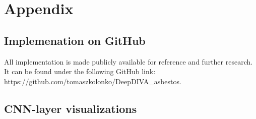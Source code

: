 \chapter{Appendix}

\section{Implemenation on GitHub}

All implementation is made publicly available for reference and further research. It can be found under the following GitHub link:
https://github.com/tomaszkolonko/DeepDIVA\_asbestos.


\section{CNN-layer visualizations}

